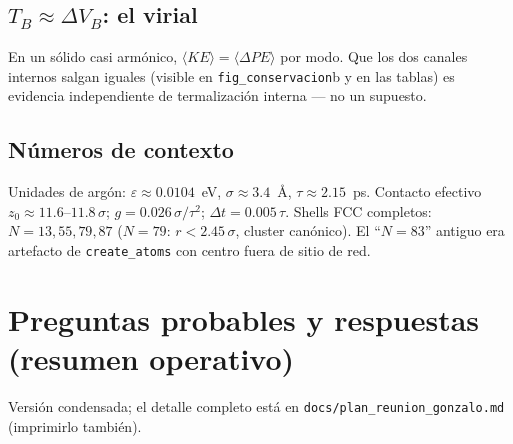 \documentclass[11pt]{article}
\newcommand{\eps}{\varepsilon}
\begin{document}
\subsection{$T_B\approx\Delta V_B$: el virial}
En un sólido casi armónico, $\langle KE\rangle=\langle\Delta
PE\rangle$ por modo. Que los dos canales internos salgan iguales
(visible en \texttt{fig\_conservacion}b y en las tablas) es evidencia
independiente de termalización interna --- no un supuesto.

\subsection{Números de contexto}
Unidades de argón: $\eps\approx0.0104$~eV, $\sigma\approx3.4$~\AA,
$\tau\approx2.15$~ps. Contacto efectivo $z_0\approx11.6$--$11.8\,\sigma$;
$g=0.026\,\sigma/\tau^2$; $\Delta t=0.005\,\tau$. Shells FCC completos:
$N=13,55,79,87$ ($N{=}79$: $r<2.45\,\sigma$, cluster canónico). El
``$N=83$'' antiguo era artefacto de \texttt{create\_atoms} con centro
fuera de sitio de red.

\section{Preguntas probables y respuestas (resumen operativo)}
Versión condensada; el detalle completo está en
\texttt{docs/plan\_reunion\_gonzalo.md} (imprimirlo también).
\end{document}

